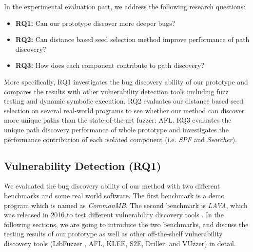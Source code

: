 In the experimental evaluation part, we address the following research questions:
\begin{itemize}
\setlength{\itemsep}{0pt}
\item {\textbf{RQ1:} Can our prototype discover more deeper bugs?}
\item {\textbf{RQ2:} Can distance based seed selection method improve performance of path discovery?}
\item {\textbf{RQ3:} How does each component contribute to path discovery?}
\end{itemize}

More specifically, RQ1 investigates the bug discovery ability of our prototype and compares the results with other vulnerability detection tools including fuzz testing and dynamic symbolic execution. RQ2 evaluates our distance based seed selection on several real-world programs to see whether our method can discover more unique paths than the state-of-the-art fuzzer: AFL. RQ3 evaluates the unique path discovery performance of whole prototype and investigates the performance contribution of each isolated component (i.e. \textit{SPF} and \textit{Searcher}).


\subsection{Vulnerability Detection (RQ1)}
We evaluated the bug discovery ability of our method with two different benchmarks and some real world software. The first benchmark is a demo program which is named as \emph{CommonMB}. The second benchmark is \emph{LAVA}, which was released in 2016 to test different vulnerability discovery tools \cite{dolan2016lava}. In the following sections, we are going to introduce the two benchmarks, and discuss the testing results of our prototype as well as other off-the-shelf vulnerability discovery tools (LibFuzzer \cite{libfuzzer}, AFL, KLEE, S2E, Driller, and VUzzer) in detail.

